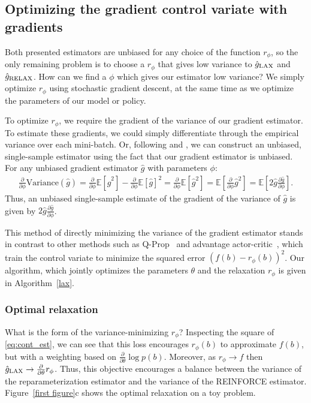 \documentclass{article}
\newcommand{\E}{\mathbb{E}}
\newcommand{\PT}{\frac{\partial}{\partial \theta}}
\newcommand{\PPH}{\frac{\partial}{\partial \phi}}
\newcommand{\LAX}{{\textnormal{LAX}}}
\newcommand{\RELAX}{{\textnormal{RELAX}}}
\begin{document}
\subsection{Optimizing the gradient control variate with gradients}
Both presented estimators are unbiased for any choice of the function $r_\phi$, so the only remaining problem is to choose a $r_\phi$ that gives low variance to $\hat g_\LAX$ and $\hat g_\RELAX{}$.
How can we find a $\phi$ which gives our estimator low variance?
We simply optimize $r_\phi$ using stochastic gradient descent, at the same time as we optimize the parameters of our model or policy.

To optimize $r_\phi$, we require the gradient of the variance of our gradient estimator.
To estimate these gradients, we could simply differentiate through the empirical variance over each mini-batch.
Or, following \cite{tucker2017rebar} and \cite{ruiz2016overdispersed}, we can construct an unbiased, single-sample estimator using the fact that our gradient estimator is unbiased.
For any unbiased gradient estimator $\hat g$ with parameters $\phi$:
%
\begin{align}
\PPH \text{Variance}(\hat g)
= \PPH \E[\hat g^2] - \PPH \E[\hat g]^2
= \PPH \E[\hat g^2]
= \E \left[ \PPH \hat g^2 \right]
= \E \left[ 2 \hat g \frac{\partial \hat g}{\partial \phi} \right].
\label{eq:vargrad}
\end{align}  %
%
Thus, an unbiased single-sample estimate of the gradient of the variance of $\hat g$ is given by {$2 \hat g \frac{\partial \hat g}{\partial \phi}$}.

This method of directly minimizing the variance of the gradient estimator stands in contrast to other methods such as Q-Prop~\citep{gu2016q} and advantage actor-critic~\citep{mnih2016asynchronous}, which train the control variate to minimize the squared error $(f(b) - r_\phi(b))^2$.
Our algorithm, which jointly optimizes the parameters $\theta$ and the relaxation $r_\phi$ is given in Algorithm~\ref{lax}.

\subsubsection{Optimal relaxation}
What is the form of the variance-minimizing $r_\phi$?
Inspecting the square of \eqref{eq:cont_est}, we can see that this loss encourages $r_\phi(b)$ to approximate $f(b)$, but with a weighting based on $\PT\log p(b)$.  %
Moreover, as $r_\phi \rightarrow f$ then $\hat g_\textnormal{\LAX} \rightarrow \PT r_\phi$.
Thus, this objective encourages a balance between the variance of the reparameterization estimator and the variance of the REINFORCE estimator.
Figure~\ref{first figure}c shows the optimal relaxation on a toy problem.
\end{document}
